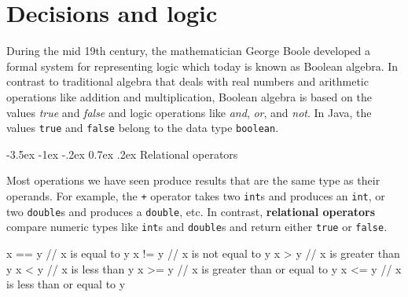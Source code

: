 \documentclass[12pt]{book}
\title{\thetitle}
\author{\theauthors}
\date{\theversion}
\makeatletter
\renewcommand{\section}{\@startsection {section}{1}{\z@}%
    {-3.5ex \@plus -1ex \@minus -.2ex}%
    {0.7ex \@plus.2ex}%
    {\normalfont\Large\bfseries}}
\theoremstyle{exercise}
\newcommand{\java}[1]{\lstinline{#1}} %
\makeatother
\begin{document}
\setcounter{chapter}{4}

\chapter{Decisions and logic}


During the mid 19th century, the mathematician George Boole developed a formal system for representing logic which today is known as Boolean algebra.
In contrast to traditional algebra that deals with real numbers and arithmetic operations like addition and multiplication, Boolean algebra is based on the values {\it true} and {\it false} and logic operations like {\it and}, {\it or}, and {\it not}.
In Java, the values \java{true} and \java{false} belong to the data type \java{boolean}.



\section{Relational operators}


Most operations we have seen produce results that are the same type as their operands.
For example, the \java{+} operator takes two \java{int}s and produces an \java{int}, or two \java{double}s and produces a \java{double}, etc.
In contrast, {\bf relational operators} compare numeric types like \java{int}s and \java{double}s and return either \java{true} or \java{false}.

\begin{code}
    x == y          // x is equal to y
    x != y          // x is not equal to y
    x > y           // x is greater than y
    x < y           // x is less than y
    x >= y          // x is greater than or equal to y
    x <= y          // x is less than or equal to y
\end{code}
\end{document}
